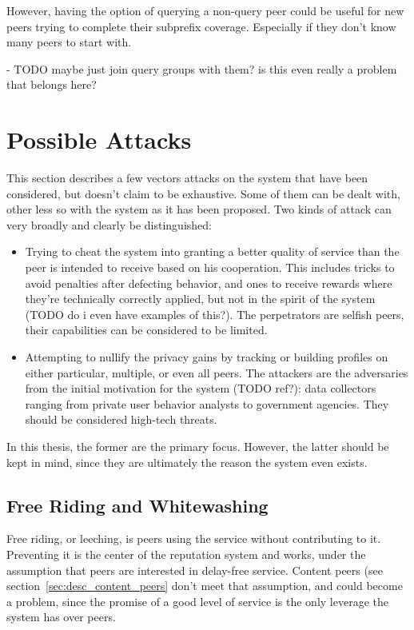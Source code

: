 However, having the option of querying a non-query peer could be useful for new
peers trying to complete their subprefix coverage. Especially if they don't know
many peers to start with.

- TODO maybe just join query groups with them? is this even really a problem
  that belongs here?

\section{Possible Attacks}
This section describes a few vectors attacks on the system that have been
considered, but doesn't claim to be exhaustive. Some of them can be dealt with,
other less so with the system as it has been proposed.  Two kinds of attack can
very broadly and clearly be distinguished:
\begin{itemize}
\item Trying to cheat the system into granting a better quality of service than
the peer is intended to receive based on his cooperation. This includes tricks
to avoid penalties after defecting behavior, and ones to receive rewards where
they're technically correctly applied, but not in the spirit of the system (TODO
do i even have examples of this?). The perpetrators are selfish peers, their
capabilities can be considered to be limited.
\item Attempting to nullify the privacy gains by tracking or building profiles
on either particular, multiple, or even all peers. The attackers are the
adversaries from the initial motivation for the system (TODO ref?): data
collectors ranging from private user behavior analysts to government agencies.
They should be considered high-tech threats.
\end{itemize}

In this thesis, the former are the primary focus. However, the latter should be
kept in mind, since they are ultimately the reason the system even exists.

\subsection{Free Riding and Whitewashing}
Free riding, or leeching, is peers using the service without contributing to it.
Preventing it is the center of the reputation system and works, under the
assumption that peers are interested in delay-free service. Content peers (see
section~\ref{sec:desc_content_peers} don't meet that assumption, and could
become a problem, since the promise of a good level of service is the only
leverage the system has over peers.

